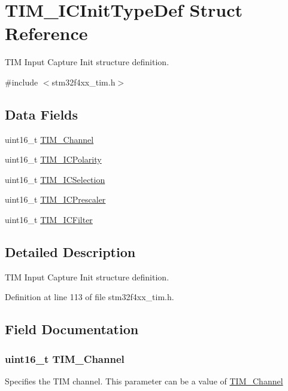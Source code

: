 \hypertarget{struct_t_i_m___i_c_init_type_def}{\section{T\-I\-M\-\_\-\-I\-C\-Init\-Type\-Def Struct Reference}
\label{struct_t_i_m___i_c_init_type_def}
}


T\-I\-M Input Capture Init structure definition.  




{\ttfamily \#include $<$stm32f4xx\-\_\-tim.\-h$>$}

\subsection*{Data Fields}
\begin{DoxyCompactItemize}
\item 
uint16\-\_\-t \hyperlink{struct_t_i_m___i_c_init_type_def_ac736e711f51054bef8b486b8521ef611}{T\-I\-M\-\_\-\-Channel}
\item 
uint16\-\_\-t \hyperlink{struct_t_i_m___i_c_init_type_def_a71dc0cc2f4eb59451ea323719b0741bb}{T\-I\-M\-\_\-\-I\-C\-Polarity}
\item 
uint16\-\_\-t \hyperlink{struct_t_i_m___i_c_init_type_def_a052908740c8c618054ef82b3ec89e9b3}{T\-I\-M\-\_\-\-I\-C\-Selection}
\item 
uint16\-\_\-t \hyperlink{struct_t_i_m___i_c_init_type_def_abdff50beb0809a640ccf2cebde439a00}{T\-I\-M\-\_\-\-I\-C\-Prescaler}
\item 
uint16\-\_\-t \hyperlink{struct_t_i_m___i_c_init_type_def_a751574b5d1f66bea6c3405d2975e420a}{T\-I\-M\-\_\-\-I\-C\-Filter}
\end{DoxyCompactItemize}


\subsection{Detailed Description}
T\-I\-M Input Capture Init structure definition. 

Definition at line 113 of file stm32f4xx\-\_\-tim.\-h.



\subsection{Field Documentation}
\hypertarget{struct_t_i_m___i_c_init_type_def_ac736e711f51054bef8b486b8521ef611}{
\subsubsection[{T\-I\-M\-\_\-\-Channel}]{\setlength{\rightskip}{0pt plus 5cm}uint16\-\_\-t T\-I\-M\-\_\-\-Channel}}\label{struct_t_i_m___i_c_init_type_def_ac736e711f51054bef8b486b8521ef611}
Specifies the T\-I\-M channel. This parameter can be a value of \hyperlink{group___t_i_m___channel}{T\-I\-M\-\_\-\-Channel} 

